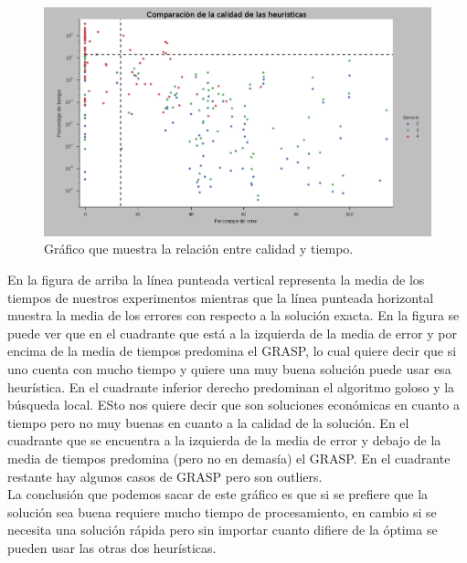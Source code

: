 \begin{figure}[H]
  \begin{center}
    \includegraphics[width=\textwidth]{img/ejercicio5/relacion_tiempo_calidad.png}
    \caption{Gr\'afico que muestra la relaci\'on entre calidad y tiempo.}
    \label{fig: ej5_relacion_tiempo_calidad}
  \end{center}
\end{figure}
En la figura de arriba la l\'inea punteada vertical representa la media de los tiempos de nuestros experimentos mientras que la l\'inea punteada horizontal muestra la media de los errores con respecto a la soluci\'on exacta.
En la figura se puede ver que en el cuadrante que est\'a a la izquierda de la media de error y por encima de la media de tiempos predomina el GRASP, lo cual quiere decir que si uno cuenta con mucho tiempo y quiere una muy buena soluci\'on puede usar esa heur\'istica. En el cuadrante inferior derecho predominan el algoritmo goloso y la b\'usqueda local. ESto nos quiere decir que son soluciones econ\'omicas en cuanto a tiempo pero no muy buenas en cuanto a la calidad de la soluci\'on. En el cuadrante que se encuentra a la izquierda de la media de error y debajo de la media de tiempos predomina (pero no en demas\'ia) el GRASP. En el cuadrante restante hay algunos casos de GRASP pero son outliers.\\
La conclusi\'on que podemos sacar de este gr\'afico es que si se prefiere que la soluci\'on sea buena requiere mucho tiempo de procesamiento, en cambio si se necesita una soluci\'on r\'apida pero sin importar cuanto difiere de la \'optima se pueden usar las otras dos heur\'isticas.